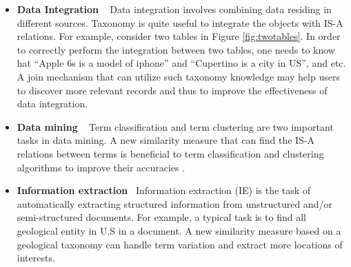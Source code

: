 \begin{itemize}
  \item \textbf{Data Integration} ~ Data integration involves combining data residing in different sources. Taxonomy is quite useful to  integrate the objects with IS-A relations. For example, consider two tables in Figure \ref{fig:twotables}. In order to correctly perform the integration between two tables, one needs to know hat ``\textsf{Apple 6s is a model of iphone}'' and ``\textsf{Cupertino is a city in US}'', and etc. A join mechanism that can utilize such taxonomy knowledge may help users to discover more relevant records and thus to improve the effectiveness of data integration.
  \item \textbf{Data mining} ~ Term classification and term clustering are two important tasks in data mining. A new similarity measure that can find the IS-A relations between terms is beneficial to term classification and clustering algorithms to improve their accuracies \cite{journals/dke/CaglieroG13}.
  \item \textbf{Information extraction}~  Information extraction (IE) is the task of automatically extracting structured information from unstructured and/or semi-structured documents. For example, a typical task is to find all geological entity in U.S in a document. A new similarity measure based on a geological taxonomy can handle term variation and extract more locations of interests.
\end{itemize}








